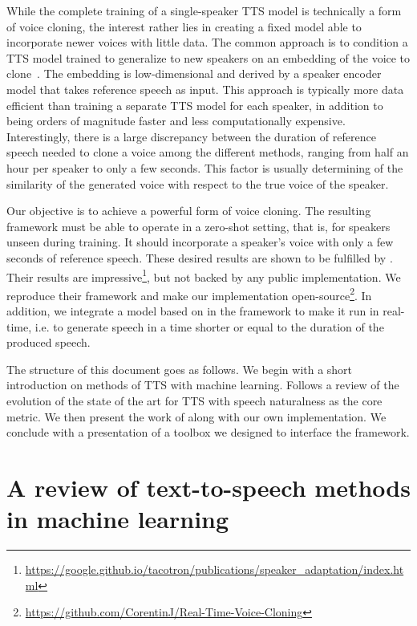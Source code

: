 \documentclass[a4paper, oneside, 12pt, english]{article}
\begin{document}
While the complete training of a single-speaker TTS model is technically a form of voice cloning, the interest rather lies in creating a fixed model able to incorporate newer voices with little data. The common approach is to condition a TTS model trained to generalize to new speakers on an embedding of the voice to clone~\citep{DeepVoice2, CloningFewSamples, SV2TTS}. The embedding is low-dimensional and derived by a speaker encoder model that takes reference speech as input. This approach is typically more data efficient than training a separate TTS model for each speaker, in addition to being orders of magnitude faster and less computationally expensive. Interestingly, there is a large discrepancy between the duration of reference speech needed to clone a voice among the different methods, ranging from half an hour per speaker to only a few seconds. This factor is usually determining of the similarity of the generated voice with respect to the true voice of the speaker.

Our objective is to achieve a powerful form of voice cloning. The resulting framework must be able to operate in a zero-shot setting, that is, for speakers unseen during training. It should incorporate a speaker's voice with only a few seconds of reference speech. These desired results are shown to be fulfilled by \citep{SV2TTS}. Their results are impressive\footnote{\url{https://google.github.io/tacotron/publications/speaker_adaptation/index.html}}, but not backed by any public implementation. We reproduce their framework and make our implementation open-source\footnote{\url{https://github.com/CorentinJ/Real-Time-Voice-Cloning}}. In addition, we integrate a model based on \citep{WaveRNN} in the framework to make it run in real-time, i.e. to generate speech in a time shorter or equal to the duration of the produced speech.

The structure of this document goes as follows. We begin with a short introduction on methods of TTS with machine learning. Follows a review of the evolution of the state of the art for TTS with speech naturalness as the core metric. We then present the work of \citep{SV2TTS} along with our own implementation. We conclude with a presentation of a toolbox we designed to interface the framework.


\section{A review of text-to-speech methods in machine learning}
\end{document}
